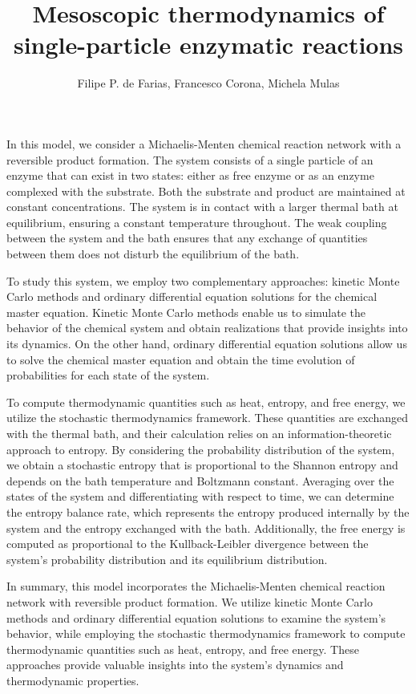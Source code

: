 \documentclass[11pt]{amsart}
\title{Mesoscopic thermodynamics of single-particle enzymatic reactions}
\author{Filipe P. de Farias, Francesco Corona, Michela Mulas}
\begin{document}
\maketitle

In this model, we consider a Michaelis-Menten chemical reaction network with a reversible product formation. The system consists of a single particle of an enzyme that can exist in two states: either as free enzyme or as an enzyme complexed with the substrate. Both the substrate and product are maintained at constant concentrations. The system is in contact with a larger thermal bath at equilibrium, ensuring a constant temperature throughout. The weak coupling between the system and the bath ensures that any exchange of quantities between them does not disturb the equilibrium of the bath.

To study this system, we employ two complementary approaches: kinetic Monte Carlo methods and ordinary differential equation solutions for the chemical master equation. Kinetic Monte Carlo methods enable us to simulate the behavior of the chemical system and obtain realizations that provide insights into its dynamics. On the other hand, ordinary differential equation solutions allow us to solve the chemical master equation and obtain the time evolution of probabilities for each state of the system.

To compute thermodynamic quantities such as heat, entropy, and free energy, we utilize the stochastic thermodynamics framework. These quantities are exchanged with the thermal bath, and their calculation relies on an information-theoretic approach to entropy. By considering the probability distribution of the system, we obtain a stochastic entropy that is proportional to the Shannon entropy and depends on the bath temperature and Boltzmann constant. Averaging over the states of the system and differentiating with respect to time, we can determine the entropy balance rate, which represents the entropy produced internally by the system and the entropy exchanged with the bath. Additionally, the free energy is computed as proportional to the Kullback-Leibler divergence between the system's probability distribution and its equilibrium distribution.

In summary, this model incorporates the Michaelis-Menten chemical reaction network with reversible product formation. We utilize kinetic Monte Carlo methods and ordinary differential equation solutions to examine the system's behavior, while employing the stochastic thermodynamics framework to compute thermodynamic quantities such as heat, entropy, and free energy. These approaches provide valuable insights into the system's dynamics and thermodynamic properties.

\nocite{*}

\footnotesize{}
\end{document}
